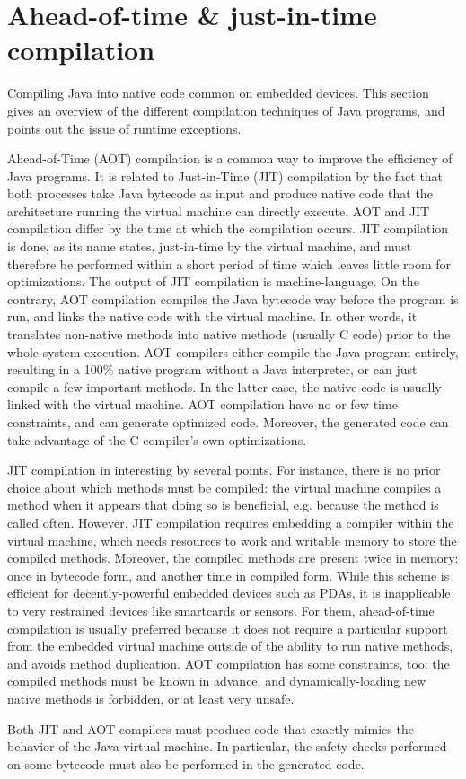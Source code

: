 \section{Ahead-of-time \& just-in-time compilation}%
\label{sec:sota}

Compiling Java into native code common on embedded devices. This section gives an overview of the different compilation techniques of Java programs,
 and points out the issue of runtime exceptions. %


Ahead-of-Time (AOT) compilation is a common way to improve the efficiency of Java programs. It is related to Just-in-Time (JIT) compilation by the fact that both processes take Java bytecode as input and produce native code that the architecture running the virtual machine can directly execute. AOT and JIT compilation differ by the time at which the compilation occurs. JIT compilation is done, as its name states, just-in-time by the virtual machine, and must therefore be performed within a short period of time which leaves little room for optimizations. The output of JIT compilation is machine-language. On the contrary, AOT compilation compiles the Java bytecode way before the program is run, and links the native code with the virtual machine. In other words, it translates non-native methods into native methods (usually C code) prior to the whole system execution. AOT compilers either compile the Java program entirely, resulting in a 100\% native program without a Java interpreter, or can just compile a few important methods. In the latter case, the native code is usually linked with the virtual machine. AOT compilation have no or few time constraints, and can generate optimized code. Moreover, the generated code can take advantage of the C compiler's own optimizations.

JIT compilation in interesting by several points. For instance, there is no prior choice about which methods must be compiled: the virtual machine compiles a method when it appears that doing so is beneficial, e.g. because the method is called often. However, JIT compilation requires embedding a compiler within the virtual machine, which needs resources to work and writable memory to store the compiled methods. Moreover, the compiled methods are present twice in memory: once in bytecode form, and another time in compiled form. While this scheme is efficient for decently-powerful embedded devices such as PDAs, it is inapplicable to very restrained devices like smartcards or sensors. For them, ahead-of-time compilation is usually preferred because it does not require a particular support from the embedded virtual machine outside of the ability to run native methods, and avoids method duplication. AOT compilation has some constraints, too: the compiled methods must be known in advance, and dynamically-loading new native methods is forbidden, or at least very unsafe.

Both JIT and AOT compilers must produce code that exactly mimics the behavior of the Java virtual machine. In particular, the safety checks performed on some bytecode must also be performed in the generated code.
